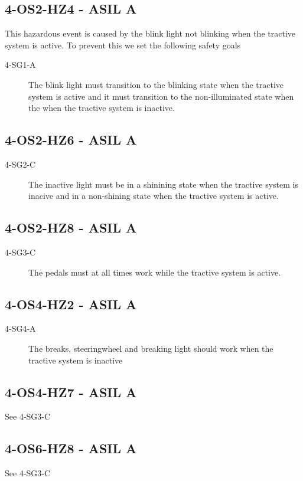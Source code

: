 \subsection{4-OS2-HZ4 - ASIL A}
This hazardous event is caused by the blink light not blinking when the tractive system is active. 
To prevent this we set the following safety goals

\begin{description}
\item [4-SG1-A] The blink light must transition to the blinking state when the tractive system is active and it must transition to the non-illuminated state when the when the tractive system is inactive.
\end{description}

\subsection{4-OS2-HZ6 - ASIL A}
\begin{description}
\item [4-SG2-C] The inactive light must be in a shinining state when the tractive system is inacive and in a non-shining state when the tractive system is active.
\end{description}
\subsection{4-OS2-HZ8 - ASIL A}
\begin{description}
\item [4-SG3-C] The pedals must at all times work while the tractive system is active.
\end{description}
\subsection{4-OS4-HZ2 - ASIL A}
\begin{description}
\item [4-SG4-A] The breaks, steeringwheel and breaking light should work when the tractive system is inactive
\end{description}
\subsection{4-OS4-HZ7 - ASIL A}
See 4-SG3-C 
\subsection{4-OS6-HZ8 - ASIL A}
See 4-SG3-C 
